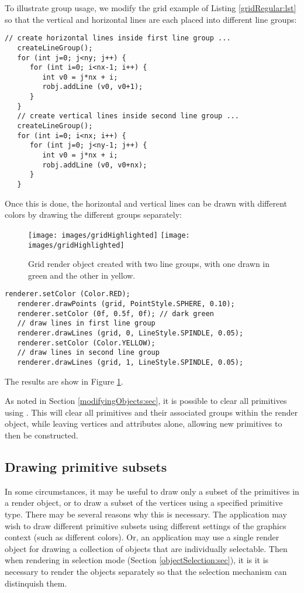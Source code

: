 %
To illustrate group usage, we modify the grid example
of Listing \ref{gridRegular:lst} so that the vertical and horizontal
lines are each placed into different line groups:
%
\begin{lstlisting}[]
   // create horizontal lines inside first line group ...
   createLineGroup();
   for (int j=0; j<ny; j++) {
      for (int i=0; i<nx-1; i++) {
         int v0 = j*nx + i;
         robj.addLine (v0, v0+1);
      }
   }
   // create vertical lines inside second line group ...
   createLineGroup();
   for (int i=0; i<nx; i++) {
      for (int j=0; j<ny-1; j++) {
         int v0 = j*nx + i;
         robj.addLine (v0, v0+nx);
      }
   }
\end{lstlisting}
%
Once this is done, the horizontal and vertical lines can be drawn with
different colors by drawing the different groups separately:
%
\begin{figure}[t]
\begin{center}
\iflatexml
 \texttt{[image: images/gridHighlighted]}
\else
 \texttt{[image: images/gridHighlighted]}
\fi
\end{center}
\caption{Grid render object created with two line groups, with
one drawn in green and the other in yellow.}
\label{gridHighlighted:fig}
\end{figure}
%
\begin{lstlisting}[]
   renderer.setColor (Color.RED);
   renderer.drawPoints (grid, PointStyle.SPHERE, 0.10);
   renderer.setColor (0f, 0.5f, 0f); // dark green
   // draw lines in first line group
   renderer.drawLines (grid, 0, LineStyle.SPINDLE, 0.05);
   renderer.setColor (Color.YELLOW);
   // draw lines in second line group
   renderer.drawLines (grid, 1, LineStyle.SPINDLE, 0.05);
\end{lstlisting}
%
The results are show in Figure \ref{gridHighlighted:fig}.

As noted in Section \ref{modifyingObjects:sec}, it is possible to
clear all primitives using
.  This will
clear all primitives and their associated groups within the render
object, while leaving vertices and attributes alone, allowing new
primitives to then be constructed.

\subsection{Drawing primitive subsets}
\label{drawingPrimitiveSubsets:sec}

In some circumstances, it may be useful to draw only a subset of the
primitives in a render object, or to draw a subset of the vertices
using a specified primitive type.  There may be several reasons why
this is necessary. The application may wish to draw different
primitive subsets using different settings of the graphics context
(such as different colors).  Or, an application may use a single
render object for drawing a collection of objects that are
individually selectable. Then when rendering in selection mode
(Section \ref{objectSelection:sec}), it is it is necessary to render
the objects separately so that the selection mechanism can distinquish
them.

